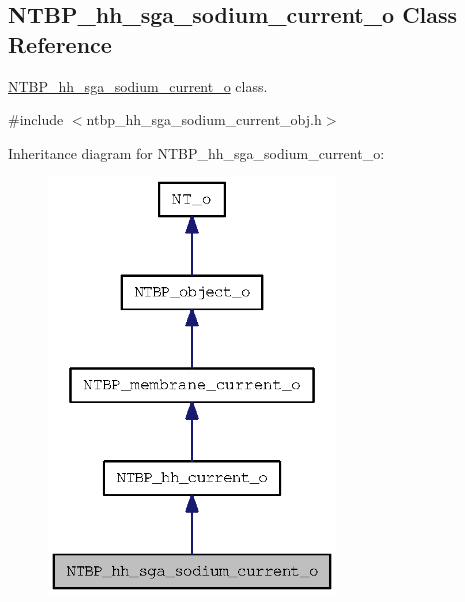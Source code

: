 \subsection{NTBP\_\-hh\_\-sga\_\-sodium\_\-current\_\-o Class Reference}
\label{class_n_t_b_p__hh__sga__sodium__current__o}


\hyperlink{class_n_t_b_p__hh__sga__sodium__current__o}{NTBP\_\-hh\_\-sga\_\-sodium\_\-current\_\-o} class.  




{\ttfamily \#include $<$ntbp\_\-hh\_\-sga\_\-sodium\_\-current\_\-obj.h$>$}



Inheritance diagram for NTBP\_\-hh\_\-sga\_\-sodium\_\-current\_\-o:
\nopagebreak
\begin{figure}[H]
\begin{center}
\leavevmode
\includegraphics[width=216pt]{class_n_t_b_p__hh__sga__sodium__current__o__inherit__graph}
\end{center}
\end{figure}


